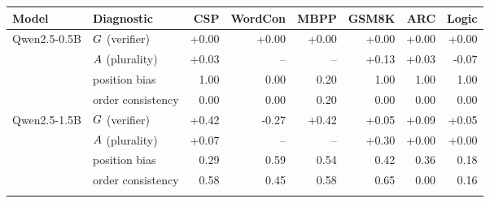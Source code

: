 \begin{tabular}{llrrrrrr}
\toprule
Model & Diagnostic & CSP & WordCon & MBPP & GSM8K & ARC & Logic \\
\midrule
Qwen2.5-0.5B & $G$ (verifier) & +0.00 & +0.00 & +0.00 & +0.00 & +0.00 & +0.00 \\
 & $A$ (plurality) & +0.03 & -- & -- & +0.13 & +0.03 & -0.07 \\
 & position bias & 1.00 & 0.00 & 0.20 & 1.00 & 1.00 & 1.00 \\
 & order consistency & 0.00 & 0.00 & 0.20 & 0.00 & 0.00 & 0.00 \\
\addlinespace
Qwen2.5-1.5B & $G$ (verifier) & +0.42 & -0.27 & +0.42 & +0.05 & +0.09 & +0.05 \\
 & $A$ (plurality) & +0.07 & -- & -- & +0.30 & +0.00 & +0.00 \\
 & position bias & 0.29 & 0.59 & 0.54 & 0.42 & 0.36 & 0.18 \\
 & order consistency & 0.58 & 0.45 & 0.58 & 0.65 & 0.00 & 0.16 \\
\addlinespace
\bottomrule
\end{tabular}